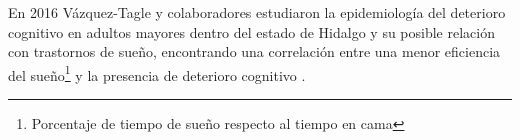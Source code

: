 En 2016 Vázquez-Tagle y colaboradores estudiaron la epidemiología del deterioro cognitivo en 
adultos mayores dentro del estado de Hidalgo y su posible relación con trastornos de sueño, 
encontrando una correlación entre una menor eficiencia del sueño\footnote{Porcentaje de tiempo
de sueño respecto al tiempo en cama} y la presencia de deterioro cognitivo \cite{VazquezTagle16}.




